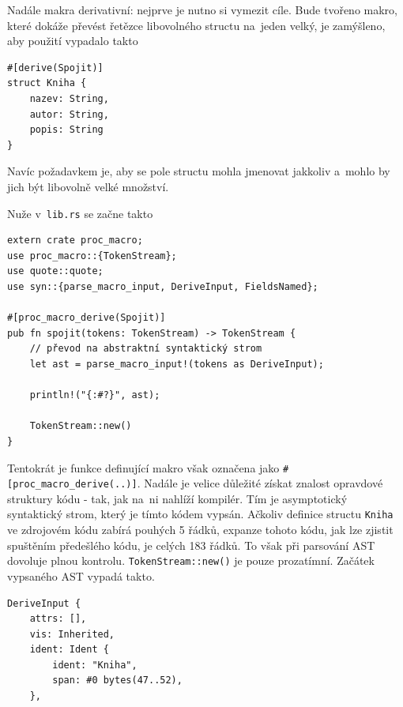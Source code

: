 \documentclass[a4paper, 12pt]{article} %
\newcommand{\rust}[1]{\texttt{#1}}
\begin{document}
            Nadále makra derivativní: nejprve je nutno si vymezit cíle. Bude tvořeno makro, které dokáže převést řetězce libovolného structu na~jeden velký, je zamýšleno, aby použití vypadalo takto
            \begin{verbatim}
#[derive(Spojit)]
struct Kniha {
    nazev: String,
    autor: String,
    popis: String
}
            \end{verbatim}

            Navíc požadavkem je, aby se pole structu mohla jmenovat jakkoliv a~mohlo by jich být libovolně velké množství.

            Nuže v~\texttt{lib.rs} se začne takto
            \begin{verbatim}
extern crate proc_macro;
use proc_macro::{TokenStream};
use quote::quote;
use syn::{parse_macro_input, DeriveInput, FieldsNamed};

#[proc_macro_derive(Spojit)]
pub fn spojit(tokens: TokenStream) -> TokenStream {
    // převod na abstraktní syntaktický strom
    let ast = parse_macro_input!(tokens as DeriveInput);
    
    println!("{:#?}", ast);

    TokenStream::new()
}
            \end{verbatim}
            
            Tentokrát je funkce definující makro však označena jako \linebreak\texttt{\#[proc\_macro\_derive(..)]}. Nadále je velice důležité získat znalost opravdové struktury kódu - tak, jak na~ni nahlíží kompilér. Tím je asymptotický syntaktický strom, který je tímto kódem vypsán. Ačkoliv definice structu \rust{Kniha} ve zdrojovém kódu zabírá pouhých 5 řádků, expanze tohoto kódu, jak lze zjistit spuštěním předešlého kódu, je celých 183 řádků. To však při parsování AST dovoluje plnou kontrolu. \rust{TokenStream::new()} je pouze prozatímní. Začátek vypsaného AST vypadá takto.
            \begin{verbatim}
DeriveInput {
    attrs: [],
    vis: Inherited,
    ident: Ident {
        ident: "Kniha",
        span: #0 bytes(47..52),
    },
            \end{verbatim}
            
\end{document}
